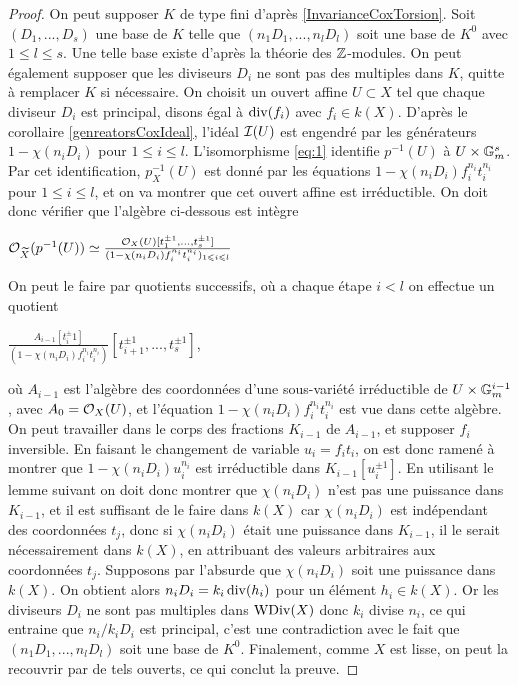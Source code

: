 \begin{proof}
On peut supposer $K$ de type fini d'après \ref{InvarianceCoxTorsion}. Soit $(D_1,...,D_s)$ une base de $K$ telle que $(n_1D_1,...,n_lD_l)$ soit une base de $K^0$ avec $1\leq l\leq s$. Une telle base existe d'après la théorie des $\mathbb{Z}$-modules. On peut également supposer que les diviseurs $D_i$ ne sont pas des multiples dans $K$, quitte à remplacer $K$ si nécessaire. On choisit un ouvert affine $U\subset X$ tel que chaque diviseur $D_i$ est principal, disons égal à $\operatorname{div}(f_i)$ avec $f_i\in k(X)$. D'après le corollaire \ref{genreatorsCoxIdeal}, l'idéal $\mathcal{I}(U)$ est engendré par les générateurs $1-\chi(n_iD_i)$ pour $1\leq i\leq l$. L'isomorphisme \ref{eq:1} identifie $p^{-1}(U)$ à $U\times \mathbb{G}_m^s$. Par cet identification, $p_X^{-1}(U)$ est donné par les équations $1-\chi(n_iD_i)f_i^{n_i}t_i^{n_i}$ pour $1\leq i\leq l$, et on va montrer que cet ouvert affine est irréductible. On doit donc vérifier que l'algèbre ci-dessous est intègre
\begin{center}
$\mathcal{O}_{\widetilde{X}}(p^{-1}(U))\simeq \frac{\mathcal{O}_X(U)[t_1^{\pm 1},...,t_s^{\pm 1}]}{(1-\chi(n_iD_i)f_i^{n_i}t_i^{n_i})_{1\leqslant i\leqslant l}}$
\end{center}
On peut le faire par quotients successifs, où a chaque étape $i<l$ on effectue un quotient
\begin{center}
$\frac{A_{i-1}[t_i^\pm 1]}{(1-\chi(n_iD_i)f_i^{n_i}t_i^{n_i})}[t_{i+1}^{\pm 1},...,t_s^{\pm 1}]$,
\end{center}
où $A_{i-1}$ est l'algèbre des coordonnées d'une sous-variété irréductible de $U\times\mathbb{G}_m^{i-1}$, avec $A_0=\mathcal{O}_X(U)$, et l'équation $1-\chi(n_iD_i)f_i^{n_i}t_i^{n_i}$ est vue dans cette algèbre. On peut travailler dans le corps des fractions $K_{i-1}$ de $A_{i-1}$, et supposer $f_i$ inversible. En faisant le changement de variable $u_i=f_it_i$, on est donc ramené à montrer que $1-\chi(n_iD_i)u_i^{n_i}$ est irréductible dans $K_{i-1}[u_i^{\pm 1}]$. En utilisant le lemme suivant on doit donc montrer que $\chi(n_iD_i)$ n'est pas une puissance dans $K_{i-1}$, et il est suffisant de le faire dans $k(X)$ car $\chi(n_iD_i)$ est indépendant des coordonnées $t_j$, donc si $\chi(n_iD_i)$ était une puissance dans $K_{i-1}$, il le serait nécessairement dans $k(X)$, en attribuant des valeurs arbitraires aux coordonnées $t_j$. Supposons par l'absurde que $\chi(n_iD_i)$ soit une puissance dans $k(X)$. On obtient alors $n_iD_i=k_i\operatorname{div}(h_i)$ pour un élément $h_i\in k(X)$. Or les diviseurs $D_i$ ne sont pas multiples dans $\operatorname{WDiv}(X)$ donc $k_i$ divise $n_i$, ce qui entraine que $n_i/k_iD_i$ est principal, c'est une contradiction avec le fait que $(n_1D_1,...,n_lD_l)$ soit une base de $K^0$. Finalement, comme $X$ est lisse, on peut la recouvrir par de tels ouverts, ce qui conclut la preuve.
\end{proof}

